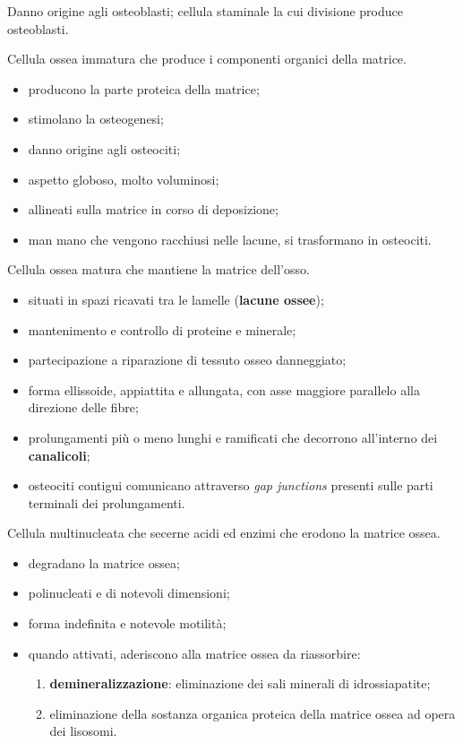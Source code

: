 Danno origine agli osteoblasti; cellula staminale la cui divisione produce osteoblasti.

Cellula ossea immatura che produce i componenti organici della matrice.
\begin{itemize}
  \item producono la parte proteica della matrice;
  \item stimolano la osteogenesi;
  \item danno origine agli osteociti;
  \item aspetto globoso, molto voluminosi;
  \item allineati sulla matrice in corso di deposizione;
  \item man mano che vengono racchiusi nelle lacune, si trasformano in osteociti.
\end{itemize}

Cellula ossea matura che mantiene la matrice dell'osso.
\begin{itemize}
  \item situati in spazi ricavati tra le lamelle (\textbf{lacune ossee});
  \item mantenimento e controllo di proteine e minerale;
  \item partecipazione a riparazione di tessuto osseo danneggiato;
  \item forma ellissoide, appiattita e allungata, con asse maggiore parallelo alla direzione delle fibre;
  \item prolungamenti più o meno lunghi e ramificati che decorrono all'interno dei \textbf{canalicoli};
  \item osteociti contigui comunicano attraverso \textit{gap junctions} presenti sulle parti terminali dei prolungamenti.
\end{itemize}

Cellula multinucleata che secerne acidi ed enzimi che erodono la matrice ossea.
\begin{itemize}
  \item degradano la matrice ossea;
  \item polinucleati e di notevoli dimensioni;
  \item forma indefinita e notevole motilità;
  \item quando attivati, aderiscono alla matrice ossea da riassorbire:
  \begin{enumerate}
    \item \textbf{demineralizzazione}: eliminazione dei sali minerali di idrossiapatite;
    \item eliminazione della sostanza organica proteica della matrice ossea ad opera dei lisosomi.
  \end{enumerate}
\end{itemize}

